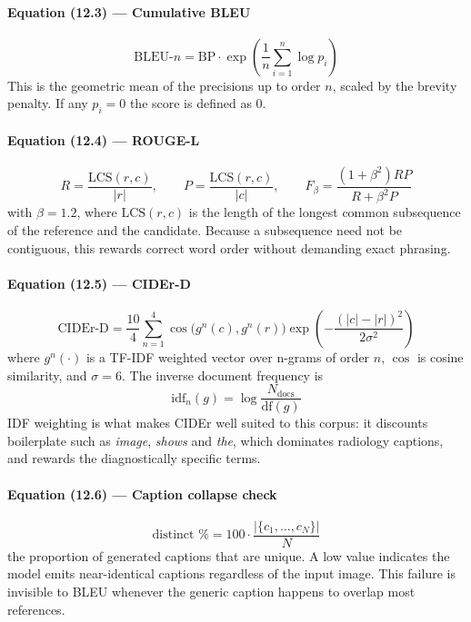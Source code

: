 \documentclass[12pt]{article}
\begin{document}
\paragraph{Equation (12.3) --- Cumulative BLEU}
\begin{equation}
\mathrm{BLEU\text{-}}n = \mathrm{BP} \cdot \exp\!\left(\frac{1}{n}\sum_{i=1}^n \log p_i\right)
\end{equation}
This is the geometric mean of the precisions up to order $n$, scaled by the brevity penalty. If any $p_i = 0$ the score is defined as 0.

\paragraph{Equation (12.4) --- ROUGE-L}
\begin{equation}
R = \frac{\mathrm{LCS}(r,c)}{|r|}, \qquad P = \frac{\mathrm{LCS}(r,c)}{|c|}, \qquad F_\beta = \frac{(1+\beta^2)RP}{R + \beta^2 P}
\end{equation}
with $\beta = 1.2$, where $\mathrm{LCS}(r,c)$ is the length of the longest common subsequence of the reference and the candidate. Because a subsequence need not be contiguous, this rewards correct word order without demanding exact phrasing.

\paragraph{Equation (12.5) --- CIDEr-D}
\begin{equation}
\mathrm{CIDEr\text{-}D} = \frac{10}{4}\sum_{n=1}^4 \cos\bigl(g^n(c), g^n(r)\bigr) \exp\!\left(-\frac{(|c|-|r|)^2}{2\sigma^2}\right)
\end{equation}
where $g^n(\cdot)$ is a TF-IDF weighted vector over n-grams of order $n$, $\cos$ is cosine similarity, and $\sigma = 6$. The inverse document frequency is
\begin{equation}
\mathrm{idf}_n(g) = \log\frac{N_{\mathrm{docs}}}{\mathrm{df}(g)}
\end{equation}
IDF weighting is what makes CIDEr well suited to this corpus: it discounts boilerplate such as \emph{image}, \emph{shows} and \emph{the}, which dominates radiology captions, and rewards the diagnostically specific terms.

\paragraph{Equation (12.6) --- Caption collapse check}
\begin{equation}
\text{distinct \%} = 100 \cdot \frac{|\{c_1, \ldots, c_N\}|}{N}
\end{equation}
the proportion of generated captions that are unique. A low value indicates the model emits near-identical captions regardless of the input image. This failure is invisible to BLEU whenever the generic caption happens to overlap most references.
\end{document}
